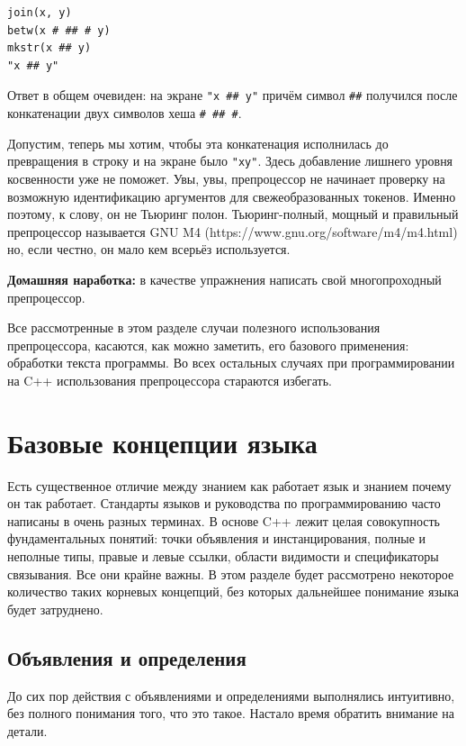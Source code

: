 \documentclass[a4paper,12pt,oneside]{book}
\begin{document}
\begin{lstlisting}
join(x, y)
betw(x # ## # y)
mkstr(x ## y)
"x ## y"
\end{lstlisting}
\fi

Ответ в общем очевиден: на экране \lstinline!"x ## y"! причём символ \lstinline!##! получился после конкатенации двух символов хеша \lstinline!# ## #!.

Допустим, теперь мы хотим, чтобы эта конкатенация исполнилась до превращения в строку и на экране было \lstinline!"xy"!. Здесь добавление лишнего уровня косвенности уже не поможет. Увы, увы, препроцессор не начинает проверку на возможную идентификацию аргументов для свежеобразованных токенов. Именно поэтому, к слову, он не Тьюринг полон. Тьюринг-полный, мощный и правильный препроцессор называется GNU M4 (https://www.gnu.org/software/m4/m4.html) но, если честно, он мало кем всерьёз используется.

\textbf{Домашняя наработка:} в качестве упражнения написать свой многопроходный препроцессор. 

Все рассмотренные в этом разделе случаи полезного использования препроцессора, касаются, как можно заметить, его базового применения: обработки текста программы. Во всех остальных случаях при программировании на C++ использования препроцессора стараются избегать.

\pagebreak
\section{Базовые концепции языка}\label{BasicTerms}

Есть существенное отличие между знанием как работает язык и знанием почему он так работает. Стандарты языков и руководства по программированию часто написаны в очень разных терминах. В основе C++ лежит целая совокупность фундаментальных понятий: точки объявления и инстанцирования, полные и неполные типы, правые и левые ссылки, области видимости и спецификаторы связывания. Все они крайне важны. В этом разделе будет рассмотрено некоторое количество таких корневых концепций, без которых дальнейшее понимание языка будет затруднено.

\subsection{Объявления и определения}\label{DeclVsDef}

До сих пор действия с объявлениями и определениями выполнялись интуитивно, без полного понимания того, что это такое. Настало время обратить внимание на детали.
\end{document}

